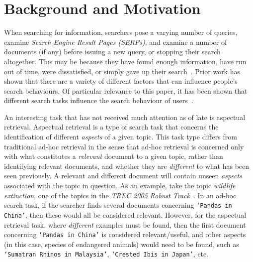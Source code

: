 \section{Background and Motivation} \label{sec:background}
When searching for information, searchers pose a varying number of queries, examine \emph{Search Engine Result Pages (SERPs)}, and examine a number of documents (if any) before issuing a new query, or stopping their search altogether. This may be because they have found enough information, have run out of time, were dissatisfied, or simply gave up their search~\cite{diriye2012abandonment,hassan2013beyond_clicks,kiseleva2015serp_fails,dostert2009stopping_behaviours,prabha2007enough,zach2005stopping_behaviours}. Prior work has shown that there are a variety of different factors that can influence people's search behaviours. Of particular relevance to this paper, it has been shown that different search tasks influence the search behaviour of users~\cite{kelly2015search_tasks}.

An interesting task that has not received much attention as of late is aspectual retrieval. Aspectual retrieval is a type of search task that concerns the identification of different \emph{aspects} of a given topic. This task type differs from traditional ad-hoc retrieval in the sense that ad-hoc retrieval is concerned only with what constitutes a \emph{relevant} document to a given topic, rather than identifying relevant documents, and whether they are \emph{different} to what has been seen previously. A relevant and different document will contain unseen \emph{aspects} associated with the topic in question. As an example, take the topic \emph{wildlife extinction}, one of the topics in the \emph{TREC 2005 Robust Track}~\cite{voorhees2006trec_robust}. In an ad-hoc search task, if the searcher finds several documents concerning \texttt{`Pandas in China'}, then these would all be considered relevant. However, for the aspectual retrieval task, where \emph{different} examples must be found, then the first document concerning \texttt{`Pandas in China'} is considered relevant/useful, and other aspects (in this case, species of endangered animals) would need to be found, such as \texttt{`Sumatran Rhinos in Malaysia'}, \texttt{`Crested Ibis in Japan'}, etc.



